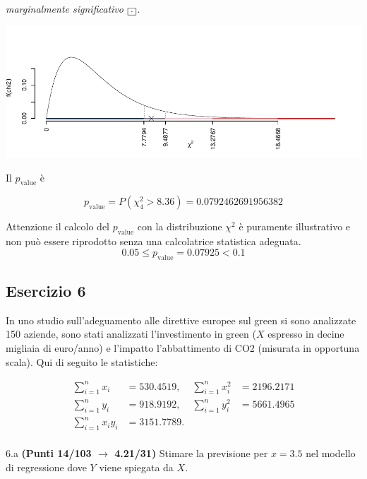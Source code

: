 \documentclass[
  11pt,
]{book}
\theoremstyle{mytheoremstyle}
\theoremstyle{mydefstyle}
\newenvironment{sol}
  {
  \begin{tcolorbox}[enhanced,breakable,arc=0.1mm,boxrule=1pt,colback=white,colframe=iblue,
  title=\bf \fontfamily{lmss}\selectfont \hspace{.5 cm} Soluzione,drop fuzzy shadow]

}{
\end{tcolorbox}
  }
\begin{document}
\begin{sol}
\emph{marginalmente significativo} \(\fbox{.}\).

\begin{center}\includegraphics{Esami_passati_con_soluzioni_files/figure-latex/2023-139-1} \end{center}

Il \(p_{\text{value}}\) è

\[ p_{\text{value}} = P(\chi^2_{4}>8.36)=0.0792462691956382 \]

Attenzione il calcolo del \(p_\text{value}\) con la distribuzione \(\chi^2\) è puramente illustrativo e non può essere riprodotto senza una calcolatrice statistica adeguata.\[
 0.05 \leq p_\text{value}= 0.07925 < 0.1 
\]

\end{sol}

\subsection{Esercizio 6}\label{esercizio-6-20}

In uno studio sull'adeguamento alle direttive europee sul green si sono analizzate 150 aziende, sono stati analizzati l'investimento in green (\(X\) espresso in decine migliaia di euro/anno) e l'impatto l'abbattimento di CO2 (misurata in opportuna scala). Qui di seguito le statistiche:

\begin{align*}
\sum_{i=1}^n x_i &= 530.4519,   &\sum_{i=1}^n x_i^2 &= 2196.2171 \\
\sum_{i=1}^n y_i &= 918.9192,   &\sum_{i=1}^n y_i^2 &= 5661.4965 \\
\sum_{i=1}^n x_iy_i &= 3151.7789.    \\
\end{align*}

6.a \textbf{(Punti 14/103 \(\rightarrow\) 4.21/31)} Stimare la previsione per \(x=3.5\) nel modello di regressione dove \(Y\) viene spiegata da \(X\).
\end{document}
